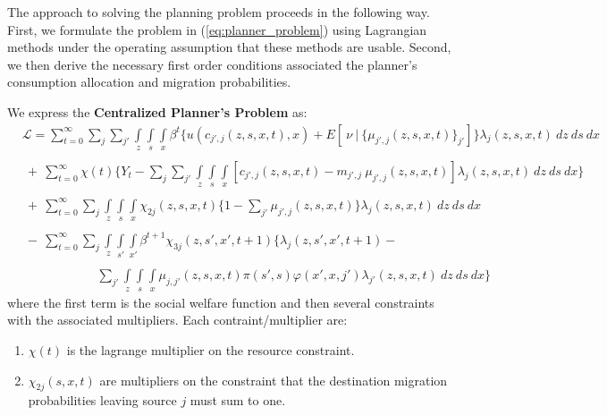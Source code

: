 \documentclass[12pt,pdftex]{article}
\begin{document}
\begin{onehalfspacing}
The approach to solving the planning problem proceeds in the following way. First, we formulate the problem in (\ref{eq:planner_problem}) using Lagrangian methods under the operating assumption that these methods are usable. Second, we then derive the necessary first order conditions associated the planner's consumption allocation and migration probabilities.

We express the \textbf{Centralized Planner's Problem} as:
{\small
\begin{align}
& \mathcal{L}  =   \sum_{t=0}^{\infty}\sum_{j} \sum_{j'} \int\limits_{z} \int\limits_{s} \int\limits_{x} \beta^{t} \bigg \{ u(c_{j',j}(z, s, x, t), x) + E[ \ \nu \ | \ \big\{\mu_{j',j}(z,s,x,t)\big\}_{j'}] \bigg \} \lambda_{j}(z, s, x, t) \ dz \ ds \ dx \label{eq:planner_L} \\
\nonumber \\
 & \ + \ \sum_{t=0}^{\infty} \chi(t) \bigg \{ Y_t - \sum_{j}\sum_{j'} \int\limits_{z} \int\limits_{s} \int\limits_{x} \left[ c_{j',j}(z, s, x, t)  -   m_{j',j} \ \mu_{j',j}(z, s, x, t)\right] \lambda_{j}(z, s, x, t) \ dz \ ds \ dx \bigg \} \nonumber \\
\nonumber  \\
& \ + \ \sum_{t=0}^{\infty} \sum_{j} \int\limits_{z} \int\limits_{s} \int\limits_{x} \chi_{2j}(z, s, x, t) \bigg \{1 - \sum_{j'} \mu_{j',j}(z, s, x,t) \bigg \} \lambda_{j}(z, s, x, t) \ dz \ ds \ dx \nonumber \\
\nonumber \\
& \ - \ \sum_{t=0}^{\infty} \sum_{j} \int\limits_{z} \int\limits_{s'} \int\limits_{x'} \beta^{t+1} \chi_{3j}(z, s', x', t+1) \bigg \{\lambda_{j}(z, s', x', t+1) - \nonumber \\
\nonumber \\
& \ \ \ \ \ \ \ \ \ \ \ \ \ \ \ \ \ \ \ \ \ \ \ \ \ \ \
 \sum_{j'} \int\limits_{z} \int\limits_{s} \int\limits_{x} \mu_{j,j'}(z,s,x,t) \pi(s',s) \varphi(x',x, j') \lambda_{j'}(z,s, x, t) \ dz \ ds  \ dx  \bigg \} \nonumber
\end{align}}where the first term is the social welfare function and then several constraints with the associated multipliers. Each contraint/multiplier are:
\begin{enumerate}
\item $\chi(t)$ is the lagrange multiplier on the resource constraint.

\item $\chi_{2j}(s, x, t)$ are multipliers on the constraint that the destination migration probabilities leaving source $j$ must sum to one.


\end{enumerate}
\end{onehalfspacing}
\end{document}

